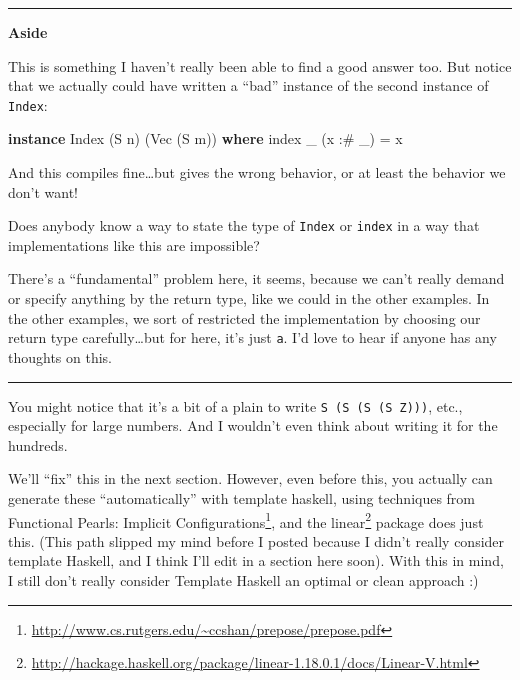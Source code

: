 \documentclass[]{article}
\newenvironment{Shaded}{}{}
\newcommand{\DataTypeTok}[1]{\textcolor[rgb]{0.56,0.13,0.00}{#1}}
\newcommand{\FunctionTok}[1]{\textcolor[rgb]{0.02,0.16,0.49}{#1}}
\newcommand{\KeywordTok}[1]{\textcolor[rgb]{0.00,0.44,0.13}{\textbf{#1}}}
\newcommand{\NormalTok}[1]{#1}
\newcommand{\OperatorTok}[1]{\textcolor[rgb]{0.40,0.40,0.40}{#1}}
\newcommand{\OtherTok}[1]{\textcolor[rgb]{0.00,0.44,0.13}{#1}}
\renewcommand{\href}[2]{#2\footnote{\url{#1}}}
\begin{document}
\begin{center}\rule{0.5\linewidth}{\linethickness}\end{center}

\textbf{Aside}

This is something I haven't really been able to find a good answer too. But
notice that we actually could have written a ``bad'' instance of the second
instance of \texttt{Index}:

\begin{Shaded}
\begin{Highlighting}[]
\KeywordTok{instance} \DataTypeTok{Index}\NormalTok{ (}\DataTypeTok{S}\NormalTok{ n) (}\DataTypeTok{Vec}\NormalTok{ (}\DataTypeTok{S}\NormalTok{ m)) }\KeywordTok{where}
    \FunctionTok{index}\NormalTok{ \_ (x }\OperatorTok{:\#}\NormalTok{ \_) }\OtherTok{=}\NormalTok{ x}
\end{Highlighting}
\end{Shaded}

And this compiles fine\ldots but gives the wrong behavior, or at least the
behavior we don't want!

Does anybody know a way to state the type of \texttt{Index} or \texttt{index} in
a way that implementations like this are impossible?

There's a ``fundamental'' problem here, it seems, because we can't really demand
or specify anything by the return type, like we could in the other examples. In
the other examples, we sort of restricted the implementation by choosing our
return type carefully\ldots but for here, it's just \texttt{a}. I'd love to hear
if anyone has any thoughts on this.

\begin{center}\rule{0.5\linewidth}{\linethickness}\end{center}

You might notice that it's a bit of a plain to write
\texttt{S\ (S\ (S\ (S\ Z)))}, etc., especially for large numbers. And I wouldn't
even think about writing it for the hundreds.

We'll ``fix'' this in the next section. However, even before this, you actually
can generate these ``automatically'' with template haskell, using techniques
from \href{http://www.cs.rutgers.edu/~ccshan/prepose/prepose.pdf}{Functional
Pearls: Implicit Configurations}, and the
\href{http://hackage.haskell.org/package/linear-1.18.0.1/docs/Linear-V.html}{linear}
package does just this. (This path slipped my mind before I posted because I
didn't really consider template Haskell, and I think I'll edit in a section here
soon). With this in mind, I still don't really consider Template Haskell an
optimal or clean approach :)
\end{document}
